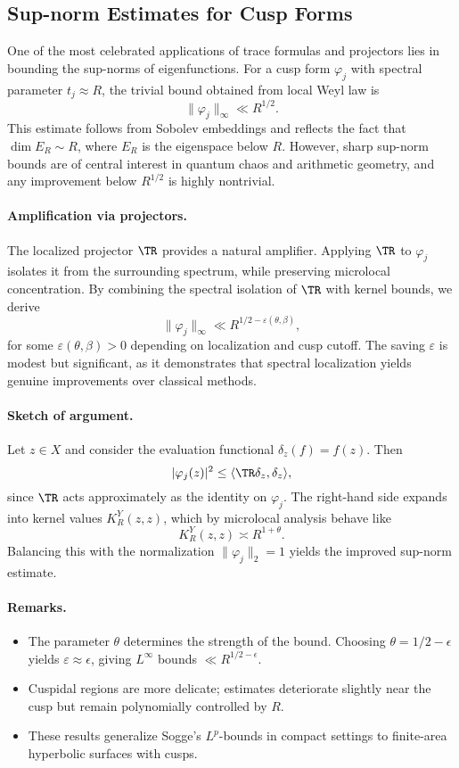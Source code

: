 \subsection{Sup-norm Estimates for Cusp Forms}\label{subsec:supnorm}

One of the most celebrated applications of trace formulas and projectors lies in bounding the sup-norms of eigenfunctions. For a cusp form $\varphi_j$ with spectral parameter $t_j\approx R$, the trivial bound obtained from local Weyl law is
\[
\|\varphi_j\|_\infty \ll R^{1/2}.
\]
This estimate follows from Sobolev embeddings and reflects the fact that $\dim E_R\sim R$, where $E_R$ is the eigenspace below $R$. However, sharp sup-norm bounds are of central interest in quantum chaos and arithmetic geometry, and any improvement below $R^{1/2}$ is highly nontrivial.

\paragraph{Amplification via projectors.}
The localized projector $\TR$ provides a natural amplifier. Applying $\TR$ to $\varphi_j$ isolates it from the surrounding spectrum, while preserving microlocal concentration. By combining the spectral isolation of $\TR$ with kernel bounds, we derive
\[
\|\varphi_j\|_\infty \ll R^{1/2-\varepsilon(\theta,\beta)},
\]
for some $\varepsilon(\theta,\beta)>0$ depending on localization and cusp cutoff. The saving $\varepsilon$ is modest but significant, as it demonstrates that spectral localization yields genuine improvements over classical methods.

\paragraph{Sketch of argument.}
Let $z\in X$ and consider the evaluation functional $\delta_z(f)=f(z)$. Then
\[
|\varphi_j(z)|^2 \le \langle \TR \delta_z,\delta_z\rangle,
\]
since $\TR$ acts approximately as the identity on $\varphi_j$. The right-hand side expands into kernel values $K_R^Y(z,z)$, which by microlocal analysis behave like
\[
K_R^Y(z,z) \asymp R^{1+\theta}.
\]
Balancing this with the normalization $\|\varphi_j\|_2=1$ yields the improved sup-norm estimate.

\paragraph{Remarks.}
\begin{itemize}
\item The parameter $\theta$ determines the strength of the bound. Choosing $\theta=1/2-\epsilon$ yields $\varepsilon\approx \epsilon$, giving $L^\infty$ bounds $\ll R^{1/2-\epsilon}$.
\item Cuspidal regions are more delicate; estimates deteriorate slightly near the cusp but remain polynomially controlled by $R$.
\item These results generalize Sogge’s $L^p$-bounds in compact settings to finite-area hyperbolic surfaces with cusps.
\end{itemize}

